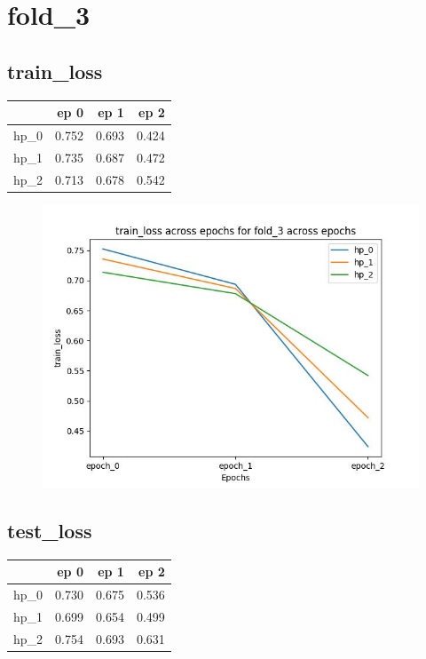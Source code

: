 \documentclass{article}
\begin{document}
\section{fold\_3}
\subsection{train\_loss}
\begin{tabular}{lrrr}
\toprule
{} &   ep 0 &   ep 1 &   ep 2 \\
\midrule
hp\_0 &  0.752 &  0.693 &  0.424 \\
hp\_1 &  0.735 &  0.687 &  0.472 \\
hp\_2 &  0.713 &  0.678 &  0.542 \\
\bottomrule
\end{tabular}

\begin{figure}[H]
\includegraphics[scale = 0.75]{fold_3/train_loss}
\end{figure}
\subsection{test\_loss}
\begin{tabular}{lrrr}
\toprule
{} &   ep 0 &   ep 1 &   ep 2 \\
\midrule
hp\_0 &  0.730 &  0.675 &  0.536 \\
hp\_1 &  0.699 &  0.654 &  0.499 \\
hp\_2 &  0.754 &  0.693 &  0.631 \\
\bottomrule
\end{tabular}
\end{document}

